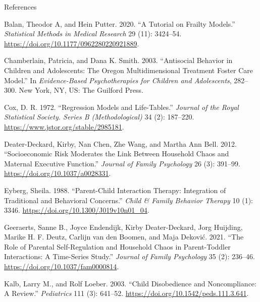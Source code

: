 \documentclass[
  ignorenonframetext,
]{beamer}
\newlength{\cslhangindent}
\newenvironment{CSLReferences}[2] %
 {\begin{list}{}{%
  \setlength{\itemindent}{0pt}
  \setlength{\leftmargin}{0pt}
  \setlength{\parsep}{0pt}
  \ifodd #1
   \setlength{\leftmargin}{\cslhangindent}
   \setlength{\itemindent}{-1\cslhangindent}
  \fi
  \setlength{\itemsep}{#2\baselineskip}}}
 {\end{list}}
\begin{document}
\begin{frame}{References}
\label{references}
\newcommand\Fontvi{\fontsize{4}{4.2}\selectfont}
\fontsize{3.75}{4.2}\selectfont

\label{refs}
\begin{CSLReferences}{1}{0}
Balan, Theodor A, and Hein Putter. 2020. {``A Tutorial on Frailty
Models.''} \emph{Statistical Methods in Medical Research} 29 (11):
3424--54. \url{https://doi.org/10.1177/0962280220921889}.

Chamberlain, Patricia, and Dana K. Smith. 2003. {``Antisocial Behavior
in Children and Adolescents: {The Oregon Multidimensional Treatment
Foster Care} Model.''} In \emph{Evidence-Based Psychotherapies for
Children and Adolescents}, 282--300. New York, NY, US: The Guilford
Press.

Cox, D. R. 1972. {``Regression {Models} and {Life-Tables}.''}
\emph{Journal of the Royal Statistical Society. Series B
(Methodological)} 34 (2): 187--220.
\url{https://www.jstor.org/stable/2985181}.

Deater-Deckard, Kirby, Nan Chen, Zhe Wang, and Martha Ann Bell. 2012.
{``Socioeconomic Risk Moderates the Link Between Household Chaos and
Maternal Executive Function.''} \emph{Journal of Family Psychology} 26
(3): 391--99. \url{https://doi.org/10.1037/a0028331}.

Eyberg, Sheila. 1988. {``Parent-Child Interaction Therapy: Integration
of Traditional and Behavioral Concerns.''} \emph{Child \& Family
Behavior Therapy} 10 (1): 3346.
\url{https://doi.org/10.1300/J019v10n01_04}.

Geeraerts, Sanne B., Joyce Endendijk, Kirby Deater-Deckard, Jorg
Huijding, Marike H. F. Deutz, Carlijn van den Boomen, and Maja Deković.
2021. {``The Role of Parental Self-Regulation and Household Chaos in
Parent-Toddler Interactions: {A} Time-Series Study.''} \emph{Journal of
Family Psychology} 35 (2): 236--46.
\url{https://doi.org/10.1037/fam0000814}.

Kalb, Larry M., and Rolf Loeber. 2003. {``Child Disobedience and
Noncompliance: A Review.''} \emph{Pediatrics} 111 (3): 641--52.
\url{https://doi.org/10.1542/peds.111.3.641}.


\end{CSLReferences}
\end{frame}
\end{document}
